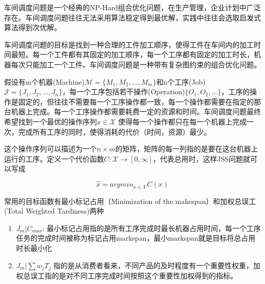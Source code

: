车间调度问题是一个经典的NP-Hard组合优化问题，在生产管理，企业计划中广泛存在。车间调度问题往往无法采用算法稳定得到最优解，实践中往往会选取启发式算法得到次优解。

车间调度问题的目标是找到一种合理的工件加工顺序，使得工件在车间内的加工时间最短。每一个工件都有其固定的加工顺序，每一个工序都有固定的加工时长，机器每次只能加工一个工件。车间调度问题是一种带有复杂图约束的组合优化问题。


假设有m个机器(Machine)$\mathcal{M}=\{M_1,M_2,\dots,M_m\}$和n个工序(Job)$\mathcal{J}=\{J_1,J_2,\dots,J_n\}$，每一个工序包括若干操作(Operation)$\{O_1,O_2,\dots\}$，工序的操作是固定的，但往往不需要每一个工序操作都一致，每一个操作都需要在指定的那台机器上完成。每一个工序操作都需要耗费一定的资源和时间。车间调度问题最终希望找到一个最优的操作序列$x\in \mathcal{X}$ 使得每一个操作都只在每一个机器上完成一次，完成所有工序的同时，使得消耗的代价（时间，资源）最少。

这个操作序列可以描述为一个$n\times m$的矩阵，矩阵的每一列指的是要在这台机器上运行的工序。定义一个代价函数$C:\mathcal{X}\rightarrow [0,\infty]$，代表总用时，这样JSS问题就可以写成

$$\hat{x}=argmin_{x\in \mathcal{X}}C(x)$$

常用的目标函数有最小标记占用（Minimization of the makespan）和加权总误工(Total Weighted Tardiness)两种

\begin{enumerate}
    \item $J_m|C_{max}$: 最小标记占用指的是所有工序完成时最长机器占用时间，每一个工序任务的完成时间被称为标记占用markspan，最小markspan就是目标将总占用时长最小化
    \item $J_m|\sum w_jT_j$ 指的是从消费者看来，不同产品的及时程度有一个重要性权重，加权总误工指的是对不同工序完成时间按照这个重要性加权得到的指标。
\end{enumerate}